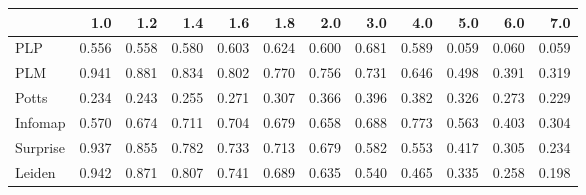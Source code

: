 \begin{tabular}{lrrrrrrrrrrr}
\toprule
{} &   1.0 &   1.2 &   1.4 &   1.6 &   1.8 &   2.0 &   3.0 &   4.0 &   5.0 &   6.0 &   7.0 \\
\midrule
PLP      & 0.556 & 0.558 & 0.580 & 0.603 & 0.624 & 0.600 & 0.681 & 0.589 & 0.059 & 0.060 & 0.059 \\
PLM      & 0.941 & 0.881 & 0.834 & 0.802 & 0.770 & 0.756 & 0.731 & 0.646 & 0.498 & 0.391 & 0.319 \\
Potts    & 0.234 & 0.243 & 0.255 & 0.271 & 0.307 & 0.366 & 0.396 & 0.382 & 0.326 & 0.273 & 0.229 \\
Infomap  & 0.570 & 0.674 & 0.711 & 0.704 & 0.679 & 0.658 & 0.688 & 0.773 & 0.563 & 0.403 & 0.304 \\
Surprise & 0.937 & 0.855 & 0.782 & 0.733 & 0.713 & 0.679 & 0.582 & 0.553 & 0.417 & 0.305 & 0.234 \\
Leiden   & 0.942 & 0.871 & 0.807 & 0.741 & 0.689 & 0.635 & 0.540 & 0.465 & 0.335 & 0.258 & 0.198 \\
\bottomrule
\end{tabular}
